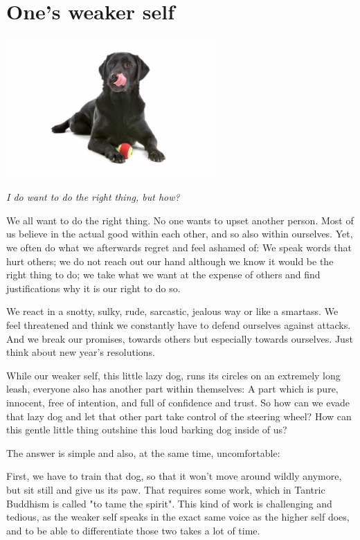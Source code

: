 \section{One's weaker self}

\begin{center}
\includegraphics[width=8cm]{images/13_weak.jpg}
\end{center}

\textit{I do want to do the right thing, but how?}

We all want to do the right thing. No one wants to upset another person. Most of us believe in the actual good within each other, and so also within ourselves. Yet, we often do what we afterwards regret and feel ashamed of: We speak words that hurt others; we do not reach out our hand although we know it would be the right thing to do; we take what we want at the expense of others and find justifications why it is our right to do so.

We react in a snotty, sulky, rude, sarcastic, jealous way or like a smartass. We feel threatened and think we constantly have to defend ourselves against attacks. And we break our promises, towards others but especially towards ourselves. Just think about new year’s resolutions.

While our weaker self, this little lazy dog, runs its circles on an extremely long leash, everyone also has another part within themselves: A part which is pure, innocent, free of intention, and full of confidence and trust. So how can we evade that lazy dog and let that other part take control of the steering wheel? How can this gentle little thing outshine this loud barking dog inside of us?

The answer is simple and also, at the same time, uncomfortable:

First, we have to train that dog, so that it won't move around wildly anymore, but sit still and give us its paw. That requires some work, which in Tantric Buddhism is called "to tame the spirit". This kind of work is challenging and tedious, as the weaker self speaks in the exact same voice as the higher self does, and to be able to differentiate those two takes a lot of time.

